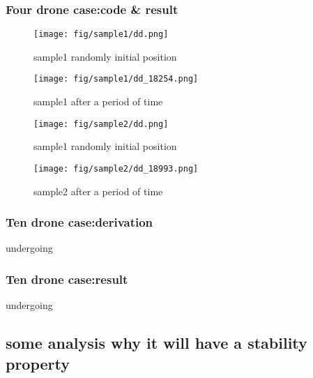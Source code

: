 \documentclass{article}
\theoremstyle{definition} %
\begin{document}
\subsubsection{Four drone case:code \& result}
\begin{figure}[ht!]
    \centering
    \begin{minipage}{0.45\textwidth}
        \centering
        \texttt{[image: fig/sample1/dd.png]} %
        \caption{sample1 randomly initial position}
        \label{fig:fig1}
    \end{minipage}\hfill
    \begin{minipage}{0.45\textwidth}
        \centering
        \texttt{[image: fig/sample1/dd\_18254.png]} %
        \caption{sample1 after a period of time}
    \end{minipage}
\end{figure}
\begin{figure}[ht!]
    \centering
    \begin{minipage}{0.45\textwidth}
        \centering
        \texttt{[image: fig/sample2/dd.png]} %
        \caption{sample1 randomly initial position}
        \label{fig:fig2}
    \end{minipage}\hfill
    \begin{minipage}{0.45\textwidth}
        \centering
        \texttt{[image: fig/sample2/dd\_18993.png]} %
        \caption{sample2 after a period of time}
    \end{minipage}
\end{figure}

\subsubsection{Ten drone case:derivation}
undergoing

\subsubsection{Ten drone case:result}
undergoing

\subsection{some analysis why it will have a stability property}
\end{document}
